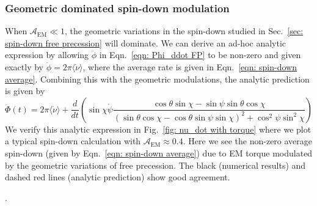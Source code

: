 \documentclass[../full_thesis/full_thesis.tex]{subfiles}
\begin{document}
\subsubsection{Geometric dominated spin-down modulation}

When $\mathcal{A}_{\mathrm{EM}} \ll 1$, the geometric variations in the
spin-down studied in Sec.~\ref{sec: spin-down free precession} will dominate.
We can derive an ad-hoc analytic expression by allowing
$\ddot{\phi}$ in Eqn.~\eqref{eqn: Phi_ddot FP} to be non-zero and given
exactly by $\ddot{\phi} = 2\pi\langle\dot{\nu}\rangle$, where the average
rate is given in Eqn.~\eqref{eqn: spin-down average}. Combining this with the
geometric modulations, the analytic prediction is given by
\begin{equation}
    \ddot{\Phi}(t) = 2\pi \langle\dot{\nu}\rangle + \frac{d}{dt}\left(
        \sin\chi\dot{\psi} \frac{\cos\theta\sin\chi - \sin \psi \sin \theta \cos\chi
}{(\sin\theta \cos \chi - \cos \theta \sin \psi \sin \chi)^{2} + \cos^{2}\psi \sin^{2} \chi}
\right)
\label{eqn: 1238}
\end{equation}
We verify this analytic expression in Fig.~\ref{fig: nu_dot with torque} where
we plot a typical spin-down calculation with $\mathcal{A}_{\mathrm{EM}} \approx
0.4$. Here we see  the non-zero average spin-down (given by Eqn.~\eqref{eqn:
spin-down average}) due to EM torque modulated by the geometric variations of
free precession. The black (numerical results) and dashed red lines (analytic
prediction) show good agreement.

.
\end{document}
